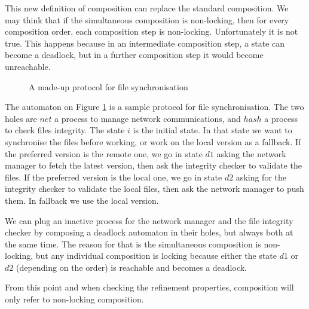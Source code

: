 \documentclass{article}
\begin{document}
This new definition of composition can replace the standard composition.
We may think that if the simultaneous composition is non-locking, then for every composition order, each composition step is non-locking.
Unfortunately it is not true.
This happens because in an intermediate composition step, a state can become a deadlock, but in a further composition step it would become unreachable.
\begin{exi}
\begin{figure}
\centering

\caption{A made-up protocol for file synchronisation}
\label{fig:pnls}
\end{figure}
The automaton on Figure \ref{fig:pnls} is a sample protocol for file synchronisation.
The two holes are \(net\) a process to manage network communications, and \(hash\) a process to check files integrity.
The state \(i\) is the initial state.
In that state we want to synchronise the files before working, or work on the local version as a fallback.
If the preferred version is the remote one, we go in state \(d1\) asking the network manager to fetch the latest version, then ask the integrity checker to validate the files.
If the preferred version is the local one, we go in state \(d2\) asking for the integrity checker to validate the local files, then ask the network manager to push them.
In fallback we use the local version.

We can plug an inactive process for the network manager and the file integrity checker by composing a deadlock automaton in their holes, but always both at the same time.
The reason for that is the simultaneous composition is non-locking, but any individual composition is locking because either the state \(d1\) or \(d2\) (depending on the order) is reachable and becomes a deadlock.
\end{exi}
From this point and when checking the refinement properties, composition will only refer to non-locking composition.
\end{document}
